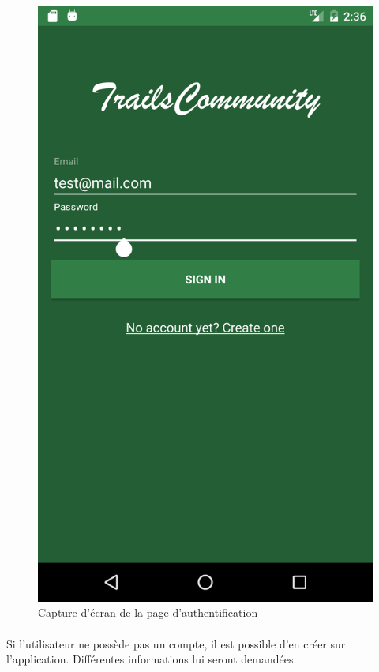 \documentclass[titlepage, 12pt]{report}
\begin{document}
\begin{figure}[!h]
	\caption{Capture d'écran de la page d'authentification}
	\label{screenshots_login}
	\centering
	\includegraphics[scale=0.2]{Images/screenshots/login.png}
\end{figure}

\paragraph{}Si l'utilisateur ne possède pas un compte, il est possible d'en créer sur l'application. Différentes informations lui seront demandées.
\end{document}
